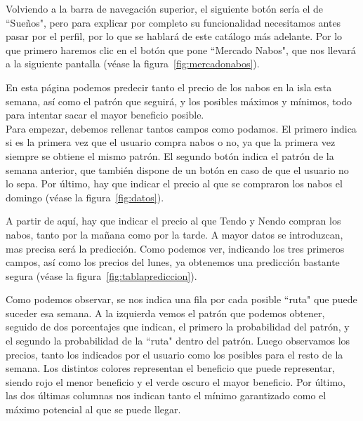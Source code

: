 \clearpage

Volviendo a la barra de navegación superior, el siguiente botón sería el de ``Sueños", pero para explicar por completo su funcionalidad necesitamos antes pasar por el perfil, por lo que se hablará de este catálogo más adelante. Por lo que primero haremos clic en el botón que pone ``Mercado Nabos", que nos llevará a la siguiente pantalla {(v\'ease la figura~\ref{fig:mercadonabos})}.\\


En esta página podemos predecir tanto el precio de los nabos en la isla esta semana, así como el patrón que seguirá, y los posibles máximos y mínimos, todo para intentar sacar el mayor beneficio posible.\\

Para empezar, debemos rellenar tantos campos como podamos. El primero indica si es la primera vez que el usuario compra nabos o no, ya que la primera vez siempre se obtiene el mismo patrón.
El segundo botón indica el patrón de la semana anterior, que también dispone de un botón en caso de que el usuario no lo sepa. Por último, hay que indicar el precio al que se compraron los nabos el domingo {(v\'ease la figura~\ref{fig:datos})}.\\


\clearpage

A partir de aquí, hay que indicar el precio al que Tendo y Nendo compran los nabos, tanto por la mañana como por la tarde. A mayor datos se introduzcan, mas precisa será la predicción. Como podemos ver, indicando los tres primeros campos, así como los precios del lunes, ya obtenemos una predicción bastante segura {(v\'ease la figura~\ref{fig:tablaprediccion})}.\\


Como podemos observar, se nos indica una fila por cada posible ``ruta" que puede suceder esa semana. A la izquierda vemos el patrón que podemos obtener, seguido de dos porcentajes que indican, el primero la probabilidad del patrón, y el segundo la probabilidad de la ``ruta" dentro del patrón. Luego observamos los precios, tanto los indicados por el usuario como los posibles para el resto de la semana. Los distintos colores representan el beneficio que puede representar, siendo rojo el menor beneficio y el verde oscuro el mayor beneficio. Por último, las dos últimas columnas nos indican tanto el mínimo garantizado como el máximo potencial al que se puede llegar.\\

